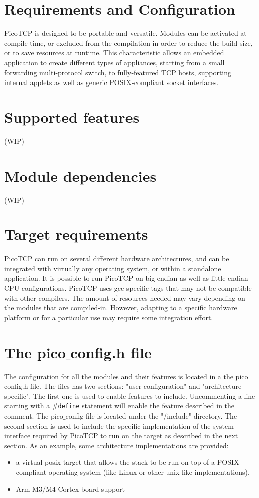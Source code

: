 
\section{Requirements and Configuration}

PicoTCP is designed to be portable and versatile. Modules can be activated at
compile-time, or excluded from the compilation in order to reduce the build size,
or to save resources at runtime. This characteristic allows an embedded
application to create different types of appliances, starting from a small
forwarding multi-protocol switch, to fully-featured TCP hosts, supporting
internal applets as well as generic POSIX-compliant socket interfaces.


\section{Supported features}
(WIP)

\section{Module dependencies}
(WIP)


\section{Target requirements}
PicoTCP can run on several different hardware architectures, and can be
integrated with virtually any operating system, or within a standalone
application. It is possible to run PicoTCP on big-endian as well as
little-endian CPU configurations. PicoTCP uses gcc-specific tags that may
not be compatible with other compilers. The amount of resources needed
may vary depending on the modules that are compiled-in. However, adapting
to a specific hardware platform or for a particular use may require some
integration effort.

\section{The pico$\_$config.h file}
The configuration for all the modules and their features is located in a
the pico$\_$config.h file. The files has two sections: "user configuration"
and "architecture specific". The first one is used to enable features to
include. Uncommenting a line starting with a \texttt{$\#$define} statement
will enable the feature described in the comment. The pico$\_$config file
is located under the "/include" directory. The second section is used to
include the specific implementation of the system interface required by
PicoTCP to run on the target as described in the next section. As an
example, some architecture implementations are provided:
\begin{itemize}
\item a virtual posix target that allows the stack to be run on top of a
POSIX compliant operating system (like Linux or other unix-like implementations).
\item Arm M3/M4 Cortex board support
\end{itemize} 

